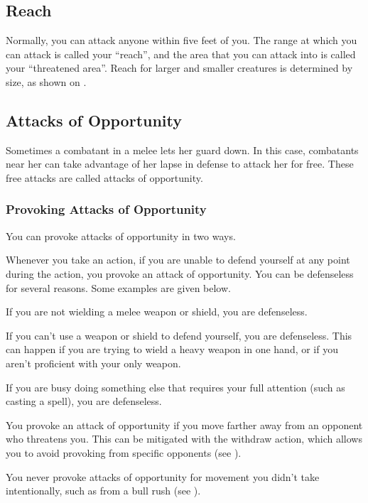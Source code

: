 \subsection{Reach}\label{Reach}
Normally, you can attack anyone within five feet of you. The range at which you can attack is called your ``reach'', and the area that you can attack into is called your ``threatened area''. Reach for larger and smaller creatures is determined by size, as shown on .

\subsection{Attacks of Opportunity}\label{Attacks of Opportunity}
Sometimes a combatant in a melee lets her guard down. In this case, combatants near her can take advantage of her lapse in defense to attack her for free. These free attacks are called attacks of opportunity.

\subsubsection{Provoking Attacks of Opportunity}
You can provoke attacks of opportunity in two ways.

 Whenever you take an action, if you are unable to defend yourself at any point during the action, you provoke an attack of opportunity. You can be defenseless for several reasons. Some examples are given below.

\begin{itemize*}
    \item If you are not wielding a melee weapon or shield, you are defenseless.
    \item If you can't use a weapon or shield to defend yourself, you are defenseless. This can happen if you are trying to wield a heavy weapon in one hand, or if you aren't proficient with your only weapon.
    \item If you are busy doing something else that requires your full attention (such as casting a spell), you are defenseless.
\end{itemize*}

 You provoke an attack of opportunity if you move farther away from an opponent who threatens you. This can be mitigated with the withdraw action, which allows you to avoid provoking from specific opponents (see ).

 You never provoke attacks of opportunity for movement you didn't take intentionally, such as from a bull rush (see ).

